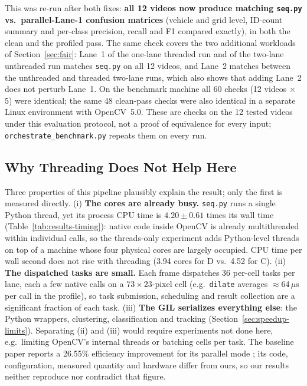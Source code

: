 \documentclass[conference]{IEEEtran}
\newcommand{\code}[1]{\texttt{#1}}
\begin{document}
This was re-run after both fixes: \textbf{all 12 videos now produce
matching \code{seq.py} vs.\ parallel-Lane-1 confusion matrices} (vehicle
and grid level, ID-count summary and per-class precision, recall and F1
compared exactly), in both the clean and the profiled pass. The same
check covers the two additional workloads of Section~\ref{sec:fair}:
Lane~1 of the one-lane threaded run and of the two-lane unthreaded run
matches \code{seq.py} on all 12 videos, and Lane~2 matches between the
unthreaded and threaded two-lane runs, which also shows that adding
Lane~2 does not perturb Lane~1. On the benchmark machine all 60 checks
(12 videos $\times$ 5) were identical; the same 48 clean-pass checks were
also identical in a separate Linux environment with OpenCV~5.0. These
are checks on the 12 tested videos under this evaluation protocol, not a
proof of equivalence for every input; \code{orchestrate\_benchmark.py}
repeats them on every run.

\subsection{Why Threading Does Not Help Here}
\label{sec:why}
Three properties of this pipeline plausibly explain the result; only the
first is measured directly. (i) \textbf{The cores are already busy.}
\code{seq.py} runs a single Python thread, yet its process CPU time is
$4.20\pm0.61$ times its wall time (Table~\ref{tab:results-timing}): native
code inside OpenCV is already multithreaded within individual calls, so
the threads-only experiment adds Python-level threads on top of a
machine whose four physical cores are largely occupied. CPU time per
wall second does not rise with threading (3.94 cores for D vs.\ 4.52 for
C). (ii) \textbf{The dispatched tasks are small.} Each frame dispatches
36 per-cell tasks per lane, each a few native calls on a $73\times23$-pixel
cell (e.g.\ \code{dilate} averages $\approx$64\,$\mu$s per call in the
profile), so task submission, scheduling and result collection are a
significant fraction of each task. (iii) \textbf{The GIL serializes
everything else}: the Python wrappers, clustering, classification and
tracking (Section~\ref{sec:speedup-limits}). Separating (ii) and (iii)
would require experiments not done here, e.g.\ limiting OpenCV's internal
threads or batching cells per task. The baseline paper reports a 26.55\%
efficiency improvement for its parallel mode \cite{baseline}; its code,
configuration, measured quantity and hardware differ from ours, so our
results neither reproduce nor contradict that figure.
\end{document}
